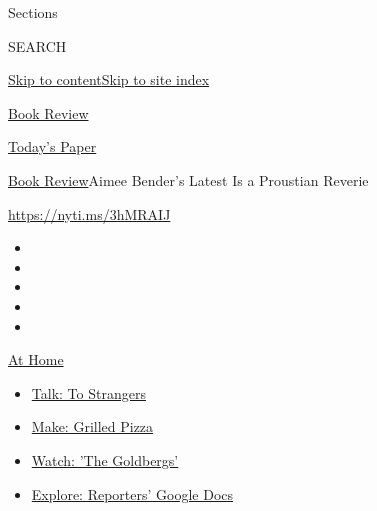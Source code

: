 Sections

SEARCH

\protect\hyperlink{site-content}{Skip to
content}\protect\hyperlink{site-index}{Skip to site index}

\href{https://www.nytimes3xbfgragh.onion/section/books/review}{Book
Review}

\href{https://myaccount.nytimes3xbfgragh.onion/auth/login?response_type=cookie\&client_id=vi}{}

\href{https://www.nytimes3xbfgragh.onion/section/todayspaper}{Today's
Paper}

\href{/section/books/review}{Book Review}\textbar{}Aimee Bender's Latest
Is a Proustian Reverie

\url{https://nyti.ms/3hMRAIJ}

\begin{itemize}
\item
\item
\item
\item
\item
\end{itemize}

\href{https://www.nytimes3xbfgragh.onion/spotlight/at-home?action=click\&pgtype=Article\&state=default\&region=TOP_BANNER\&context=at_home_menu}{At
Home}

\begin{itemize}
\tightlist
\item
  \href{https://www.nytimes3xbfgragh.onion/2020/08/03/well/family/the-benefits-of-talking-to-strangers.html?action=click\&pgtype=Article\&state=default\&region=TOP_BANNER\&context=at_home_menu}{Talk:
  To Strangers}
\item
  \href{https://www.nytimes3xbfgragh.onion/2020/08/01/at-home/coronavirus-make-pizza-on-a-grill.html?action=click\&pgtype=Article\&state=default\&region=TOP_BANNER\&context=at_home_menu}{Make:
  Grilled Pizza}
\item
  \href{https://www.nytimes3xbfgragh.onion/2020/07/31/arts/television/goldbergs-abc-stream.html?action=click\&pgtype=Article\&state=default\&region=TOP_BANNER\&context=at_home_menu}{Watch:
  'The Goldbergs'}
\item
  \href{https://www.nytimes3xbfgragh.onion/interactive/2020/at-home/even-more-reporters-editors-diaries-lists-recommendations.html?action=click\&pgtype=Article\&state=default\&region=TOP_BANNER\&context=at_home_menu}{Explore:
  Reporters' Google Docs}
\end{itemize}

